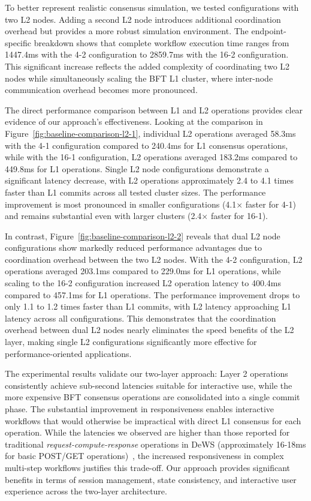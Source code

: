 \documentclass[conference]{IEEEtran}
\begin{document}
To better represent realistic consensus simulation, we tested configurations with two L2 nodes. Adding a second L2 node introduces additional coordination overhead but provides a more robust simulation environment. The endpoint-specific breakdown shows that complete workflow execution time ranges from 1447.4ms with the 4-2 configuration to 2859.7ms with the 16-2 configuration. This significant increase reflects the added complexity of coordinating two L2 nodes while simultaneously scaling the BFT L1 cluster, where inter-node communication overhead becomes more pronounced.

The direct performance comparison between L1 and L2 operations provides clear evidence of our approach's effectiveness. Looking at the comparison in Figure~\ref{fig:baseline-comparison-l2-1}, individual L2 operations averaged 58.3ms with the 4-1 configuration compared to 240.4ms for L1 consensus operations, while with the 16-1 configuration, L2 operations averaged 183.2ms compared to 449.8ms for L1 operations. Single L2 node configurations demonstrate a significant latency decrease, with L2 operations approximately 2.4 to 4.1 times faster than L1 commits across all tested cluster sizes. The performance improvement is most pronounced in smaller configurations (4.1× faster for 4-1) and remains substantial even with larger clusters (2.4× faster for 16-1).

In contrast, Figure~\ref{fig:baseline-comparison-l2-2} reveals that dual L2 node configurations show markedly reduced performance advantages due to coordination overhead between the two L2 nodes. With the 4-2 configuration, L2 operations averaged 203.1ms compared to 229.0ms for L1 operations, while scaling to the 16-2 configuration increased L2 operation latency to 400.4ms compared to 457.1ms for L1 operations. The performance improvement drops to only 1.1 to 1.2 times faster than L1 commits, with L2 latency approaching L1 latency across all configurations. This demonstrates that the coordination overhead between dual L2 nodes nearly eliminates the speed benefits of the L2 layer, making single L2 configurations significantly more effective for performance-oriented applications.

The experimental results validate our two-layer approach: Layer 2 operations consistently achieve sub-second latencies suitable for interactive use, while the more expensive BFT consensus operations are consolidated into a single commit phase.
The substantial improvement in responsiveness enables interactive workflows that would otherwise be impractical with direct L1 consensus for each operation.
While the latencies we observed are higher than those reported for traditional \textit{request-compute-response} operations in DeWS (approximately 16-18ms for basic POST/GET operations)~\cite{ramachandran_dews_2023}, the increased responsiveness in complex multi-step workflows justifies this trade-off. Our approach provides significant benefits in terms of session management, state consistency, and interactive user experience across the two-layer architecture.
\end{document}

